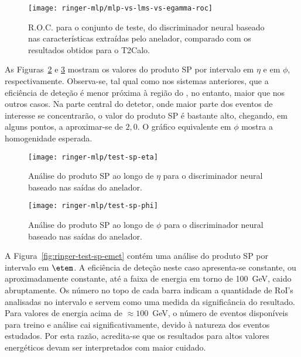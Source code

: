 \begin{figure}
\begin{center}
\texttt{[image: ringer-mlp/mlp-vs-lms-vs-egamma-roc]}
\end{center}
\caption{R.O.C. para o conjunto de teste, do discriminador neural baseado nas
características extraídas pelo anelador, comparado com os resultados obtidos
para o T2Calo.}
\label{fig:ringer-test-roc}
\end{figure}

As Figuras~\ref{fig:ringer-test-sp-eta} e \ref{fig:ringer-test-sp-phi} mostram
os valores do produto SP por intervalo em $\eta$ e em $\phi$,
respectivamente. Observa-se, tal qual como nos sistemas anteriores, que a
eficiência de deteção é menor próxima à região do , no entanto,
maior que nos outros casos. Na parte central do detetor, onde maior parte dos
eventos de interesse se concentrarão, o valor do produto SP é bastante alto,
chegando, em alguns pontos, a aproximar-se de $2,0$. O gráfico equivalente em
$\phi$ mostra a homogenidade esperada.

\begin{figure}
\begin{center}
\texttt{[image: ringer-mlp/test-sp-eta]}
\end{center}
\caption{Análise do produto SP ao longo de $\eta$ para o discriminador neural
baseado nas saídas do anelador.}
\label{fig:ringer-test-sp-eta}
\end{figure}

\begin{figure}
\begin{center}
\texttt{[image: ringer-mlp/test-sp-phi]}
\end{center}
\caption{Análise do produto SP ao longo de $\phi$ para o discriminador neural
baseado nas saídas do anelador.}
\label{fig:ringer-test-sp-phi}
\end{figure}

A Figura~\ref{fig:ringer-test-sp-emet} contém uma análise do produto SP por
intervalo em $\etem$. A eficiência de deteção neste caso apresenta-se
constante, ou aproximadamente constante, até a faixa de energia em torno de
100~GeV, caido abruptamente. Os número no topo de cada barra indicam a
quantidade de RoI's analisadas no intervalo e servem como uma medida da
significância do resultado. Para valores de energia acima de $\approx
100$~GeV, o número de eventos disponíveis para treino e análise cai
significativamente, devido à natureza dos eventos estudados. Por esta razão,
acredita-se que os resultados para altos valores energéticos devam ser
interpretados com maior cuidado.

